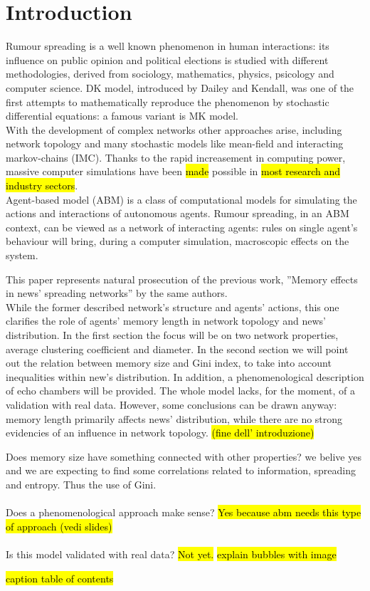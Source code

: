 \section{Introduction} \label{introduction}
Rumour spreading is a well known phenomenon in human interactions:
its influence on public opinion\cite{publicoprumsp} and political
elections\cite{politicalrumsp} is studied with different
methodologies, derived from sociology, mathematics,
physics, psicology and computer science.
DK model,\cite{DKmodel} introduced by Dailey and Kendall, was one of
the first attempts to mathematically reproduce the phenomenon by
stochastic differential equations: a famous variant is MK
model.\cite{MKmodel}\\
With the development of complex networks other approaches arise,
including network topology and many stochastic models
like mean-field\cite{meanfield} and interacting markov-chains\cite{IMC} (IMC).
Thanks to the rapid increasement in computing power,
massive computer simulations have been \hl{made} possible in
\hl{most research and industry sectors}.\\
Agent-based model (ABM) is a class of computational models for
simulating the actions and interactions of autonomous
agents.\cite{Agentbased}
Rumour spreading, in an ABM context, can be viewed as a network
of interacting agents: rules on single agent's behaviour
will bring, during a computer simulation, macroscopic
effects on the system.

This paper represents natural prosecution of the previous work,
''Memory effects in news' spreading networks'' by the same
authors.\cite{ourpaper}\\
While the former described network's structure and agents' actions,
this one clarifies the role of agents' memory length in network
topology and news' distribution. In the first section the focus
will be on two network properties, average clustering coefficient
and diameter. In the second section we will point out the relation
between memory size and Gini index, to take into account inequalities
within new's distribution.
In addition, a phenomenological description of echo chambers
will be provided.
The whole model lacks, for the moment, of a validation with real data.
However, some conclusions can be drawn anyway: memory length
primarily affects news' distribution, while there are no strong
evidencies of an influence in network topology.
\hl{(fine dell' introduzione)}


Does memory size have something connected with other properties?
we belive yes and we are expecting to find some correlations related
to information, spreading and entropy. Thus the use of Gini.\\ \\
Does a phenomenological approach make sense? \hl{Yes because abm needs
this type of approach (vedi slides)}\\ \\
Is this model validated with real data? \hl{Not yet.}
\hl{explain bubbles with image}

\hl{caption table of contents}